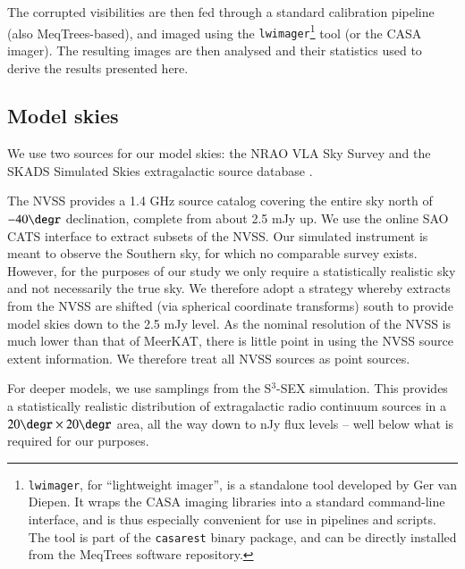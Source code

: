 \documentclass{aa}
\begin{document}
The corrupted visibilities are then fed through a standard calibration pipeline (also MeqTrees-based), and imaged using the {\tt lwimager}\footnote{{\tt lwimager}, for ``lightweight imager'', is a standalone tool developed by Ger van Diepen. It wraps the CASA imaging libraries into a standard command-line interface, and is thus especially convenient for use in pipelines and scripts. The tool is part of the {\tt casarest} binary package, and can be directly installed from the MeqTrees software repository.} tool (or the CASA imager). The resulting images are then analysed and their statistics used to derive the results presented here.


\subsection{Model skies}

We use two sources for our model skies: the NRAO VLA Sky Survey \citep[NVSS:][]{NVSS} and the SKADS Simulated Skies extragalactic source database \citep[S$^3$-SEX:][]{S3-SEX}. 

The NVSS provides a 1.4 GHz source catalog covering the entire sky north of $-40\degr$ declination, complete from about 2.5 mJy up. We use the online SAO CATS interface \citep{SAO-CATS} to extract subsets of the NVSS. Our simulated instrument is meant to observe the Southern sky, for which no comparable survey exists. However, for the purposes of our study we only require a statistically realistic sky and not necessarily the true sky. We therefore adopt a strategy whereby extracts from the NVSS are shifted (via spherical coordinate transforms) south to provide model skies down to the 2.5 mJy level. As the nominal resolution of the NVSS is much lower than that of MeerKAT, there is little point in using the NVSS source extent information. We therefore treat all NVSS sources as point sources. 

For deeper models, we use samplings from the S$^3$-SEX simulation. This provides a statistically realistic distribution of extragalactic radio continuum sources in a $20\degr\times20\degr$ area, all the way down to nJy flux levels -- well below what is required for our purposes.
\end{document}
